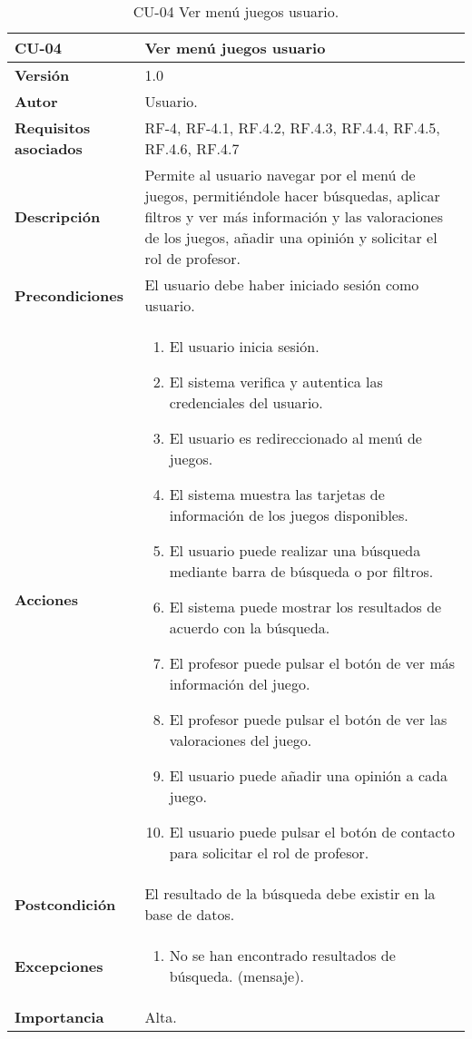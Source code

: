 \begin{table}[h!]
	\centering
	\begin{tabularx}{\linewidth}{ p{} p{} }
		\toprule
		\textbf{CU-04}    & \textbf{Ver menú juegos usuario}\\
		\toprule
		\textbf{Versión}              & 1.0    \\
		\textbf{Autor}                & Usuario. \\
		\textbf{Requisitos asociados} & RF-4, RF-4.1, RF.4.2, RF.4.3, RF.4.4, RF.4.5, RF.4.6, RF.4.7 \\
		\textbf{Descripción}          & Permite al usuario navegar por el menú de juegos, permitiéndole hacer búsquedas, aplicar filtros y ver más información y las valoraciones de los juegos, añadir una opinión y solicitar el rol de profesor.\\
		\textbf{Precondiciones}         & El usuario debe haber iniciado sesión como usuario. \\
		\textbf{Acciones}             &
		\begin{enumerate}
			\def\labelenumi{\arabic{enumi}.}
			\tightlist
			\item El usuario inicia sesión.
            \item El sistema verifica y autentica las credenciales del usuario.
            \item El usuario es redireccionado al menú de juegos.
            \item El sistema muestra las tarjetas de información de los juegos disponibles.
            \item El usuario puede realizar una búsqueda mediante barra de búsqueda o por filtros.
            \item El sistema puede mostrar los resultados de acuerdo con la búsqueda.
            \item El profesor puede pulsar el botón de ver más información del juego.
            \item El profesor puede pulsar el botón de ver las valoraciones del juego.
            \item El usuario puede añadir una opinión a cada juego.
            \item El usuario puede pulsar el botón de contacto para solicitar el rol de profesor.
		\end{enumerate}\\
         \textbf{Postcondición}             & El resultado de la búsqueda debe existir en la base de datos. \\
		\textbf{Excepciones}             &
		\begin{enumerate}
			\def\labelenumi{\arabic{enumi}.}
			\tightlist
			\item No se han encontrado resultados de búsqueda. (mensaje).
		\end{enumerate}\\
		\textbf{Importancia}          & Alta. \\
		\bottomrule
	\end{tabularx}
	\caption{CU-04 Ver menú juegos usuario.}
\end{table}

